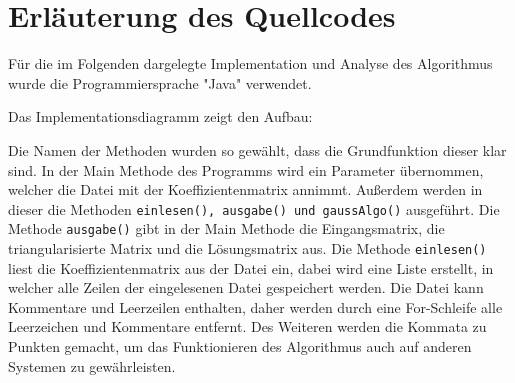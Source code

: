 \documentclass[a4paper, 12pt]{report}
\begin{document}
{\let\clearpage\relax \chapter{Erläuterung des Quellcodes}}
Für die im Folgenden dargelegte Implementation und Analyse des Algorithmus wurde die Programmiersprache "Java" verwendet.

Das Implementationsdiagramm zeigt den Aufbau: \newline
\begin{center}
{\ttfamily
{}
}
\end{center}
Die Namen der Methoden wurden so gewählt, dass die Grundfunktion dieser klar sind.
In der Main Methode des Programms wird ein Parameter übernommen,
welcher die Datei mit der Koeffizientenmatrix annimmt. Außerdem werden
in dieser die Methoden \texttt{einlesen(), ausgabe() und gaussAlgo()} ausgeführt.
Die Methode \texttt{ausgabe()} gibt in der Main Methode die Eingangsmatrix, die triangularisierte Matrix
und die Lösungsmatrix aus. \newline
Die Methode \texttt{einlesen()} liest die Koeffizientenmatrix aus der Datei ein,
dabei wird eine Liste erstellt, in welcher alle Zeilen der eingelesenen Datei gespeichert werden.
Die Datei kann Kommentare und Leerzeilen enthalten, daher werden durch eine For-Schleife alle Leerzeichen und Kommentare entfernt.
Des Weiteren werden die Kommata zu Punkten gemacht,
um das Funktionieren des Algorithmus auch auf anderen Systemen zu gewährleisten.
\end{document}
